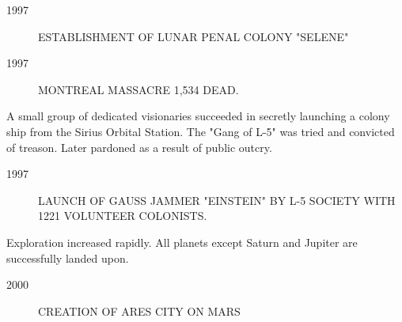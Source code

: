 \begin{description}
	\item[1997]   ESTABLISHMENT OF LUNAR PENAL COLONY "SELENE"
	\item[1997]   MONTREAL MASSACRE 1,534 DEAD.
\end{description}

A small group of dedicated visionaries succeeded in secretly
launching a colony ship from the Sirius Orbital Station. The
"Gang of L-5" was tried and convicted of treason. Later
pardoned as a result of public outcry.
\begin{description}
	\item[1997]   LAUNCH OF GAUSS JAMMER "EINSTEIN" BY L-5 SOCIETY WITH
       1221 VOLUNTEER COLONISTS.
\end{description}

Exploration increased rapidly. All planets except Saturn and
Jupiter are successfully landed upon.
\begin{description}
	\item[2000]   CREATION OF ARES CITY ON MARS
\end{description}

